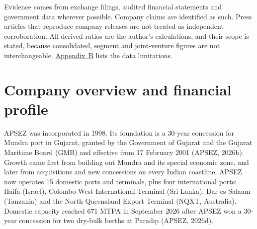 \documentclass[12pt, a4paper]{article}
\begin{document}
Evidence comes from exchange filings, audited financial statements and
government data wherever possible. Company claims are identified as such. Press
articles that reproduce company releases are not treated as independent
corroboration. All derived ratios are the author's calculations, and their
scope is stated, because consolidated, segment and joint-venture figures are not
interchangeable. \hyperref[app:data]{Appendix~B} lists the data limitations.

\section{Company overview and financial profile}\label{sec:company}
APSEZ was incorporated in 1998. Its foundation is a 30-year concession for
Mundra port in Gujarat, granted by the Government of Gujarat and the Gujarat
Maritime Board (GMB) and effective from 17 February 2001 (APSEZ, 2026b). Growth
came first from building out Mundra and its special economic zone, and later
from acquisitions and new concessions on every Indian coastline. APSEZ now
operates 15 domestic ports and terminals, plus four international ports: Haifa
(Israel), Colombo West International Terminal (Sri Lanka), Dar es Salaam
(Tanzania) and the North Queensland Export Terminal (NQXT, Australia). Domestic
capacity reached 671 MTPA in September 2026 after APSEZ won a 30-year concession
for two dry-bulk berths at Paradip (APSEZ, 2026d).
\end{document}

